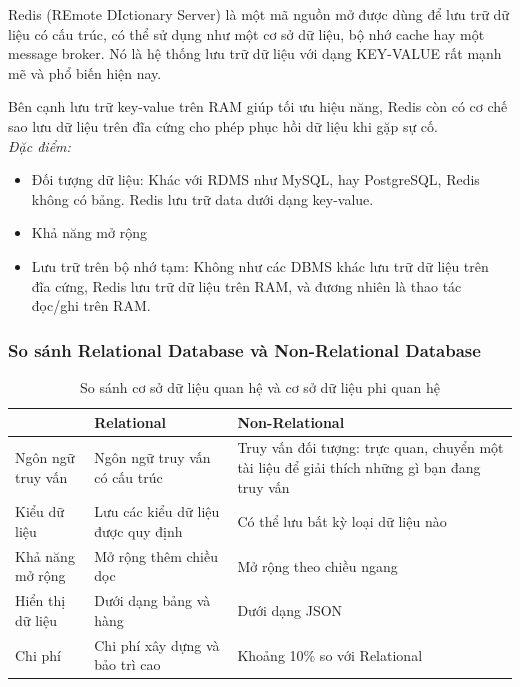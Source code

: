 Redis (REmote DIctionary Server) là một mã nguồn mở được dùng để lưu trữ dữ liệu có cấu trúc, có thể sử dụng như một cơ sở dữ liệu, bộ nhớ cache hay một message broker. Nó là hệ thống lưu trữ dữ liệu với dạng KEY-VALUE rất mạnh mẽ và phổ biến hiện nay.

Bên cạnh lưu trữ key-value trên RAM giúp tối ưu hiệu năng, Redis còn có cơ chế sao lưu dữ liệu trên đĩa cứng cho phép phục hồi dữ liệu khi gặp sự cố.\\

\textit{Đặc điểm:}
\begin{itemize}
    \item Đối tượng dữ liệu: Khác với RDMS như MySQL, hay PostgreSQL, Redis không có bảng. Redis lưu trữ data dưới dạng key-value.
    \item Khả năng mở rộng
    \item Lưu trữ trên bộ nhớ tạm: Không như các DBMS khác lưu trữ dữ liệu trên đĩa cứng, Redis lưu trữ dữ liệu trên RAM, và đương nhiên là thao tác đọc/ghi trên RAM.
\end{itemize}
\subsubsection{So sánh Relational Database và Non-Relational Database}
\begin{table}[H]
	    \centering
	    \begin{tabular}{|p{3cm}|p{6cm}|p{6cm}|}
	        \hline
	        &\textbf{Relational}&\textbf{Non-Relational}\\
	        \hline
	        Ngôn ngữ truy vấn&Ngôn ngữ truy vấn có cấu trúc &Truy vấn đối tượng: trực quan, chuyển một tài liệu để giải thích những gì bạn đang truy vấn\\
	        \hline
	        Kiểu dữ liệu&Lưu các kiểu dữ liệu được quy định&Có thể lưu bất kỳ loại dữ liệu nào\\
	        \hline
	        Khả năng mở rộng&Mở rộng thêm chiều dọc&Mở rộng theo chiều ngang\\
	        \hline
	        Hiển thị dữ liệu&Dưới dạng bảng và hàng&Dưới dạng JSON\\
	        \hline
	        Chi phí&Chi phí xây dựng và bảo trì cao&Khoảng 10\% so với Relational\\
	        \hline
	    \end{tabular}
	    \caption{So sánh cơ sở dữ liệu quan hệ và cơ sở dữ liệu phi quan hệ}
	\end{table}
	
